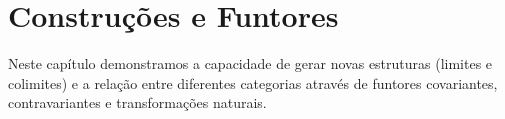 
\chapter{Construções e Funtores}
Neste capítulo demonstramos a capacidade de gerar novas estruturas (limites e
colimites) e a relação entre diferentes categorias através de funtores covariantes,
contravariantes e transformações naturais.



























